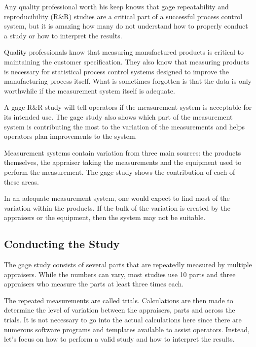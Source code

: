 
Any quality professional worth his keep knows that gage repeatability and reproducibility (R&R) studies are a critical part of a successful process control system, but it is amazing how many do not understand how to properly conduct a study or how to interpret the results. 

Quality professionals know that measuring manufactured products is critical to maintaining the customer specification. They also know that measuring products is necessary for statistical process control systems designed to improve the manufacturing process itself. What is sometimes forgotten is that the data is only worthwhile if the measurement system itself is adequate. 

A gage R&R study will tell operators if the measurement system is acceptable for its intended use. The gage study also shows which part of the measurement system is contributing the most to the variation of the measurements and helps operators plan improvements to the system. 

Measurement systems contain variation from three main sources: the products themselves, the appraiser taking the measurements and the equipment used to perform the measurement. The gage study shows the contribution of each of these areas. 

In an adequate measurement system, one would expect to find most of the variation within the products. If the bulk of the variation is created by the appraisers or the equipment, then the system may not be suitable.
 

\subsection*{Conducting the Study}
The gage study consists of several parts that are repeatedly measured by multiple appraisers. While the numbers can vary, most studies use 10 parts and three appraisers who measure the parts at least three times each. 

The repeated measurements are called trials. Calculations are then made to determine the level of variation between the appraisers, parts and across the trials. It is not necessary to go into the actual calculations here since there are numerous software programs and templates available to assist operators. Instead, let’s focus on how to perform a valid study and how to interpret the results.

